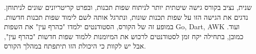 שנית, נציב בקורס גישה שיטתית יותר לניתוח שפות תכנות, ובפרט קריטריונים שונים
לניתוחן. נדגים את הגישה הזו על שפות תכנות שונות, ונתרגל אותה לשם לימוד שפות
תכנות חדשות. במופע זה של הקורס, הסטודנטים ילמדו "כהרף עין" את השפות Go, Dart,
AWK ועוד. כמובן, בתחילה יקח זמן לסטודנטים לרכוש את המיומנות ללמוד שפות חדשות
"כהרף עין", אבל יש לקוות כי היכולת הזו תיתפתח במהלך הקורס. 
